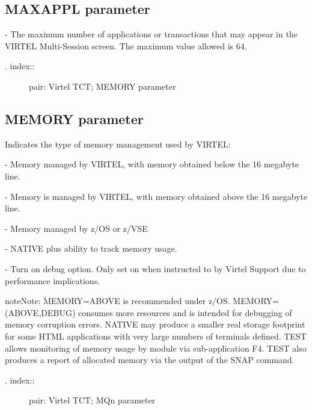 \documentclass[letterpaper,10pt,english]{sphinxmanual}
\begin{document}
\subsection{MAXAPPL parameter}
\label{\detokenize{Installation_Guide:maxappl-parameter}}
\begin{sphinxVerbatim}[commandchars=\\\{\}]
                            
\end{sphinxVerbatim}

 - The maximum number of applications or transactions that may appear in the VIRTEL Multi-Session screen. The maximum value allowed is 64.
\begin{description}
\item[{. index::}] \leavevmode
pair: Virtel TCT; MEMORY parameter

\end{description}


\subsection{MEMORY parameter}
\label{\detokenize{Installation_Guide:memory-parameter}}
\begin{sphinxVerbatim}[commandchars=\\\{\}]
\PYG{p}{[}\PYG{p}{]} 
\end{sphinxVerbatim}

Indicates the type of memory management used by VIRTEL:

 - Memory managed by VIRTEL, with memory obtained below the 16 megabyte line.

 - Memory is managed by VIRTEL, with memory obtained above the 16 megabyte line.

 - Memory managed by z/OS or z/VSE

 - NATIVE plus ability to track memory usage.

 - Turn on debug option. Only set on when instructed to by Virtel Support due to performance implications.

\begin{sphinxadmonition}{note}{Note:}
MEMORY=ABOVE is recommended under z/OS. MEMORY=(ABOVE,DEBUG) consumes more resources and is intended for debugging of memory corruption errors. NATIVE may produce a smaller real storage footprint for some HTML applications with very large numbers of terminals defined. TEST allows monitoring of memory usage by module via sub-application F4. TEST also produces a report of allocated memory via the output of the SNAP command.
\end{sphinxadmonition}
\begin{description}
\item[{. index::}] \leavevmode
pair: Virtel TCT; MQn parameter

\end{description}
\end{document}

